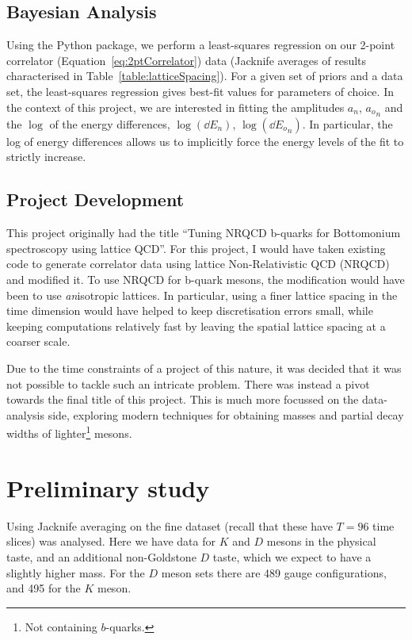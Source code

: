 \documentclass[a4paper,12pt]{article}
\begin{document}
\subsection{Bayesian Analysis}
Using the \cite{lepage2020corrfitter} Python package, we perform a least-squares regression on our 2-point correlator (Equation~\ref{eq:2ptCorrelator}) data (Jacknife averages of results characterised in Table~\ref{table:latticeSpacing}). For a given set of priors and a data set, the least-squares regression gives best-fit values for parameters of choice. In the context of this project, we are interested in fitting the amplitudes $a_n$, ${a_o}_n$ and the $\log$ of the energy differences, $\log(\dd E_n)$, $\log({\dd E_o}_n)$. In particular, the log of energy differences allows us to implicitly force the energy levels of the fit to strictly increase.

\subsection{Project Development}
This project originally had the title ``Tuning NRQCD b-quarks for Bottomonium spectroscopy using lattice QCD''. For this project, I would have taken existing code to generate correlator data using lattice Non-Relativistic QCD (NRQCD) and modified it. To use NRQCD for b-quark mesons, the modification would have been to use \emph{an}isotropic lattices. In particular, using a finer lattice spacing in the time dimension would have helped to keep discretisation errors small, while keeping computations relatively fast by leaving the spatial lattice spacing at a coarser scale.

Due to the time constraints of a project of this nature, it was decided that it was not possible to tackle such an intricate problem. There was instead a pivot towards the final title of this project. This is much more focussed on the data-analysis side, exploring modern techniques for obtaining masses and partial decay widths of lighter\footnote{Not containing $b$-quarks.} mesons.

\section{Preliminary study}

Using Jacknife averaging on the fine dataset (recall that these have $T=96$ time slices) was analysed. Here we have data for $K$ and $D$ mesons in the physical taste, and an additional non-Goldstone $D$ taste, which we expect to have a slightly higher mass. For the $D$ meson sets there are 489 gauge configurations, and 495 for the $K$ meson. 
\end{document}
